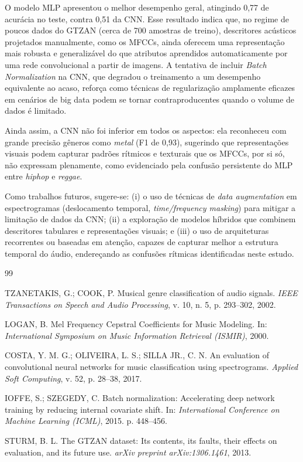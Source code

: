 \documentclass[conference]{IEEEtran}
\begin{document}
	O modelo MLP apresentou o melhor desempenho geral, atingindo 0,77 de acurácia no teste, contra 0,51 da CNN. Esse resultado indica que, no regime de poucos dados do GTZAN (cerca de 700 amostras de treino), descritores acústicos projetados manualmente, como os MFCCs, ainda oferecem uma representação mais robusta e generalizável do que atributos aprendidos automaticamente por uma rede convolucional a partir de imagens. A tentativa de incluir \textit{Batch Normalization} na CNN, que degradou o treinamento a um desempenho equivalente ao acaso, reforça como técnicas de regularização amplamente eficazes em cenários de big data podem se tornar contraproducentes quando o volume de dados é limitado.
	
	Ainda assim, a CNN não foi inferior em todos os aspectos: ela reconheceu com grande precisão gêneros como \textit{metal} (F1 de 0,93), sugerindo que representações visuais podem capturar padrões rítmicos e texturais que os MFCCs, por si só, não expressam plenamente, como evidenciado pela confusão persistente do MLP entre \textit{hiphop} e \textit{reggae}.
	
	Como trabalhos futuros, sugere-se: (i) o uso de técnicas de \textit{data augmentation} em espectrogramas (deslocamento temporal, \textit{time/frequency masking}) para mitigar a limitação de dados da CNN; (ii) a exploração de modelos híbridos que combinem descritores tabulares e representações visuais; e (iii) o uso de arquiteturas recorrentes ou baseadas em atenção, capazes de capturar melhor a estrutura temporal do áudio, endereçando as confusões rítmicas identificadas neste estudo.
	
	\begin{thebibliography}{99}
		
		TZANETAKIS, G.; COOK, P. Musical genre classification of audio signals.
		\textit{IEEE Transactions on Speech and Audio Processing}, v. 10, n. 5, p. 293--302, 2002.
		
		LOGAN, B. Mel Frequency Cepstral Coefficients for Music Modeling. In: \textit{International Symposium on Music Information Retrieval (ISMIR)}, 2000.
		
		COSTA, Y. M. G.; OLIVEIRA, L. S.; SILLA JR., C. N. An evaluation of convolutional neural networks for music classification using spectrograms. \textit{Applied Soft Computing}, v. 52, p. 28--38, 2017.
		
		IOFFE, S.; SZEGEDY, C. Batch normalization: Accelerating deep network training by reducing internal covariate shift. In: \textit{International Conference on Machine Learning (ICML)}, 2015. p. 448--456.
		
		STURM, B. L. The GTZAN dataset: Its contents, its faults, their effects on evaluation, and its future use. \textit{arXiv preprint arXiv:1306.1461}, 2013.
		
	\end{thebibliography}
	
\end{document}
